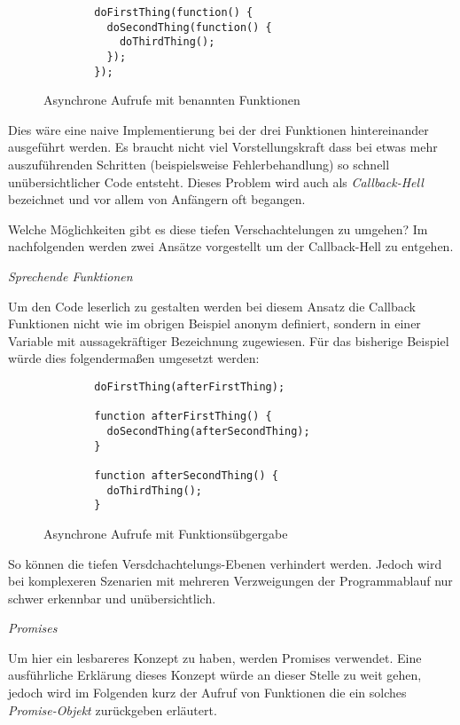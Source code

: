 \begin{figure}[t]
	\centering
	\begin{lstlisting}
        doFirstThing(function() {
          doSecondThing(function() {
            doThirdThing();
          });
        });
    \end{lstlisting}
	\caption[node-example-2]{Asynchrone Aufrufe mit benannten Funktionen}
	\label{f:node-example-2}
\end{figure}

Dies wäre eine naive Implementierung bei der drei Funktionen
hintereinander ausgeführt werden. Es braucht nicht viel
Vorstellungskraft dass bei etwas mehr auszuführenden Schritten
(beispielsweise Fehlerbehandlung) so schnell unübersichtlicher Code
entsteht. Dieses Problem wird auch als \emph{Callback-Hell} bezeichnet und
vor allem von Anfängern oft begangen.

Welche Möglichkeiten gibt es diese tiefen Verschachtelungen zu umgehen?
Im nachfolgenden werden zwei Ansätze vorgestellt um der
Callback-Hell zu entgehen.

\emph{Sprechende Funktionen}

Um den Code leserlich zu gestalten werden bei diesem Ansatz die Callback
Funktionen nicht wie im obrigen Beispiel anonym definiert, sondern in
einer Variable mit aussagekräftiger Bezeichnung zugewiesen. Für das
bisherige Beispiel würde dies folgendermaßen umgesetzt werden:

\begin{figure}[t]
	\centering
	\begin{lstlisting}
        doFirstThing(afterFirstThing);

        function afterFirstThing() {
          doSecondThing(afterSecondThing);
        }

        function afterSecondThing() {
          doThirdThing();
        }
    \end{lstlisting}
	\caption[node-example-3]{Asynchrone Aufrufe mit Funktionsübgergabe}
	\label{f:node-example-3}
\end{figure}

So können die tiefen Versdchachtelungs-Ebenen verhindert werden. Jedoch
wird bei komplexeren Szenarien mit mehreren Verzweigungen der
Programmablauf nur schwer erkennbar und unübersichtlich.

\emph{Promises}

Um hier ein lesbareres Konzept zu haben, werden Promises verwendet. Eine
ausführliche Erklärung dieses Konzept würde an dieser Stelle zu weit
gehen, jedoch wird im Folgenden kurz der Aufruf von Funktionen die ein
solches \emph{Promise-Objekt} zurückgeben erläutert.

